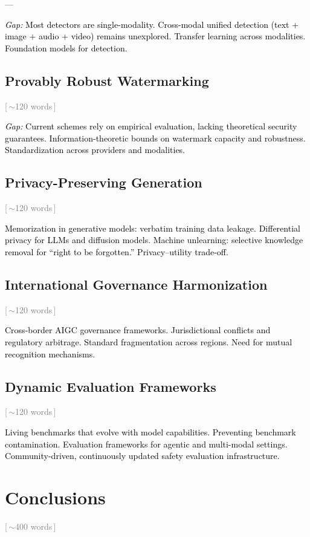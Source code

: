 ––\documentclass[preprint,12pt]{elsarticle}
\newcommand{\wordcount}[1]{\hfill\textcolor{gray}{\small[\,#1\,]}}
\newcommand{\outline}[1]{\textcolor{black}{#1}}
\begin{document}
\outline{%
\emph{Gap:} Most detectors are single-modality. Cross-modal unified detection (text + image + audio + video) remains unexplored. Transfer learning across modalities. Foundation models for detection.
}

\subsection{Provably Robust Watermarking} \wordcount{$\sim$120 words}

\outline{%
\emph{Gap:} Current schemes rely on empirical evaluation, lacking theoretical security guarantees. Information-theoretic bounds on watermark capacity and robustness. Standardization across providers and modalities.
}

\subsection{Privacy-Preserving Generation} \wordcount{$\sim$120 words}

\outline{%
Memorization in generative models: verbatim training data leakage. Differential privacy for LLMs and diffusion models. Machine unlearning: selective knowledge removal for ``right to be forgotten.'' Privacy--utility trade-off.
}

\subsection{International Governance Harmonization} \wordcount{$\sim$120 words}

\outline{%
Cross-border AIGC governance frameworks. Jurisdictional conflicts and regulatory arbitrage. Standard fragmentation across regions. Need for mutual recognition mechanisms.
}

\subsection{Dynamic Evaluation Frameworks} \wordcount{$\sim$120 words}

\outline{%
Living benchmarks that evolve with model capabilities. Preventing benchmark contamination. Evaluation frameworks for agentic and multi-modal settings. Community-driven, continuously updated safety evaluation infrastructure.
}


\section{Conclusions} \wordcount{$\sim$400 words}
\label{sec:conclusions}
\end{document}
